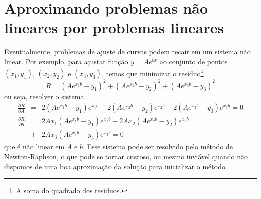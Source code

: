 


\section{Aproximando problemas não lineares por problemas lineares}

Eventualmente, problemas de ajuste de curvas podem recair em um sistema não linear. Por exemplo, para ajustar função $y=Ae^{bx}$ ao conjunto de pontos $(x_1,y_1)$, $(x_2,y_2)$ e $(x_3,y_3)$, temos que minimizar o resíduo\footnote{A soma do quadrado dos resíduos.} 
$$
R=(Ae^{x_1b}-y_1)^2+(Ae^{x_2b}-y_2)^2+(Ae^{x_3b}-y_3)^2
$$
ou seja, resolver o sistema
\begin{eqnarray*}
\frac{\partial R}{\partial A} &=& 2(Ae^{x_1b}-y_1)e^{x_1b}+2(Ae^{x_2b}-y_2)e^{x_2b}+2(Ae^{x_3b}-y_3)e^{x_3b}=0\\
\frac{\partial R}{\partial b} &=& 2Ax_1(Ae^{x_1b}-y_1)e^{x_1b} + 2Ax_2(Ae^{x_2b}-y_2)e^{x_2b} \\
&+& 2Ax_3(Ae^{x_3b}-y_3)e^{x_3b}=0
\end{eqnarray*}
que é não linear em $A$ e $b$. Esse sistema pode ser resolvido pelo método de Newton-Raphson, o que pode se tornar custoso, ou mesmo inviável quando não dispomos de uma boa aproximação da solução para inicializar o método.

